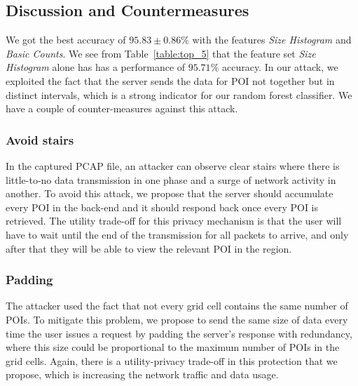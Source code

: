 \documentclass[9pt,conference]{IEEEtran}
\begin{document}
\subsection{Discussion and Countermeasures}
We got the best accuracy of $95.83 \pm{0.86} \%$ with the features \textit{Size Histogram} and \textit{Basic Counts}. We see from Table~\ref{table:top_5} that the feature set \textit{Size Histogram} alone has has a performance of $95.71\%$ accuracy. In our attack, we exploited the fact that the server sends the data for POI not together but in distinct intervals, which is a strong indicator for our random forest classifier. We have a couple of counter-measures against this attack.

\subsubsection{Avoid stairs}
In the captured PCAP file, an attacker can observe clear stairs where there is little-to-no data transmission in one phase and a surge of network activity in another. To avoid this attack, we propose that the server should accumulate every POI in the back-end and it should respond back once every POI is retrieved. The utility trade-off for this privacy mechanism is that the user will have to wait until the end of the transmission for all packets to arrive, and only after that they will be able to view the relevant POI in the region.

\subsubsection{Padding}
The attacker used the fact that not every grid cell contains the same number of POIs. To mitigate this problem, we propose to send the same size of data every time the user issues a request by padding the server's response with redundancy, where this size could be proportional to the maximum number of POIs in the grid cells. Again, there is a utility-privacy trade-off in this protection that we propose, which is increasing the network traffic and data usage.





\end{document}
